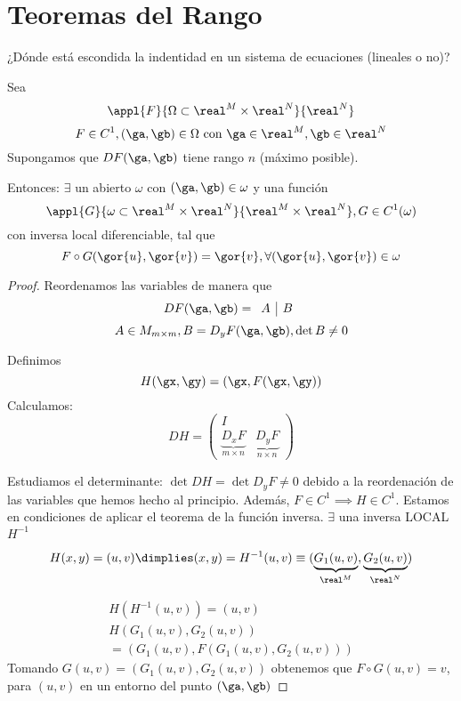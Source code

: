 \section{Teoremas del Rango}
\label{secRango}
¿Dónde está escondida la indentidad en un sistema de ecuaciones (lineales o no)?

\begin{theorem}
Sea \[\appl{F}{\Omega\subset \real^M\times\real^N}{\real^N}\]
\[F\in C^1, (\ga,\gb) \in \Omega \text{ con } \ga \in \real^M, \gb \in \real^N\]
Supongamos que $DF(\ga,\gb)$ tiene rango $n$ (máximo posible).

Entonces: $\exists$ un abierto $\omega$ con $(\ga,\gb) \in \omega$ y una función \[ \appl{G}{\omega\subset\real^M\times\real^N}{\real^M\times\real^N}, G\in C^1 (\omega)\] con inversa local diferenciable, tal que \[F\circ G(\gor{u},\gor{v}) = \gor{v}, \forall(\gor{u},\gor{v})\in \omega\]

\end{theorem}

\begin{proof}
 Reordenamos las variables de manera que \[DF(\ga,\gb) = \begin{array}{c|c} A &B \end{array}\]
 \[A \in M_{m\times m}, B = D_yF(\ga,\gb), \det B \neq 0\]
 
 Definimos \[H(\gx,\gy) = (\gx,F(\gx,\gy))\]
 Calculamos:
 \[DH = \left(\begin{array}{c|c}
         I & \\
         \underbrace{D_xF}_{m\times n} & \underbrace{D_yF}_{n\times n}
        \end{array}\right)\]
        
        
  Estudiamos el determinante: $\det DH = \det D_yF \neq 0$ debido a la reordenación de las variables que hemos hecho al principio. Además, $F\in C^1 \implies H \in C^1$. Estamos en condiciones de aplicar el teorema de la función inversa. $\exists$ una inversa LOCAL $H^{-1}$

  \[H(x,y) = (u,v) \dimplies (x,y) = H^{-1}(u,v) \equiv (\underbrace{G_1(u,v)}_{\real^M},\underbrace{G_2(u,v)}_{\real^N})\]
  
  \begin{gather*}
H(H^{-1}(u,v)) = (u,v)\\
H(G_1(u,v),G_2(u,v))\\
= (G_1(u,v),F(G_1(u,v),G_2(u,v)))
  \end{gather*}
 Tomando $G(u,v) = (G_1(u,v),G_2(u,v))$ obtenemos que $F\circ G(u,v) = v$, para $(u,v)$ en un entorno del punto $(\ga,\gb)$
 
\end{proof}

